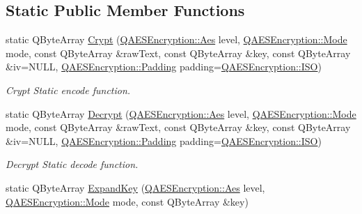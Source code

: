 \subsection*{Static Public Member Functions}
\begin{DoxyCompactItemize}
\item 
static Q\+Byte\+Array \mbox{\hyperlink{class_q_a_e_s_encryption_a43819eeb6a7cb29fbd3cb6ad640dcbdf}{Crypt}} (\mbox{\hyperlink{class_q_a_e_s_encryption_abe48208f4f6c7d68e6a10b49b9d0b7bd}{Q\+A\+E\+S\+Encryption\+::\+Aes}} level, \mbox{\hyperlink{class_q_a_e_s_encryption_ad3e031c49a3d56566379d75b40b7b255}{Q\+A\+E\+S\+Encryption\+::\+Mode}} mode, const Q\+Byte\+Array \&raw\+Text, const Q\+Byte\+Array \&key, const Q\+Byte\+Array \&iv=N\+U\+LL, \mbox{\hyperlink{class_q_a_e_s_encryption_ab0a65cdea4eac21ef32530010d1b0247}{Q\+A\+E\+S\+Encryption\+::\+Padding}} padding=\mbox{\hyperlink{class_q_a_e_s_encryption_ab0a65cdea4eac21ef32530010d1b0247a4fb686e6a16d4242ff35311d2e7c422d}{Q\+A\+E\+S\+Encryption\+::\+I\+SO}})
\begin{DoxyCompactList}\small\item\em Crypt Static encode function. \end{DoxyCompactList}\item 
static Q\+Byte\+Array \mbox{\hyperlink{class_q_a_e_s_encryption_af9baa154a06683049d941bd06ac698fd}{Decrypt}} (\mbox{\hyperlink{class_q_a_e_s_encryption_abe48208f4f6c7d68e6a10b49b9d0b7bd}{Q\+A\+E\+S\+Encryption\+::\+Aes}} level, \mbox{\hyperlink{class_q_a_e_s_encryption_ad3e031c49a3d56566379d75b40b7b255}{Q\+A\+E\+S\+Encryption\+::\+Mode}} mode, const Q\+Byte\+Array \&raw\+Text, const Q\+Byte\+Array \&key, const Q\+Byte\+Array \&iv=N\+U\+LL, \mbox{\hyperlink{class_q_a_e_s_encryption_ab0a65cdea4eac21ef32530010d1b0247}{Q\+A\+E\+S\+Encryption\+::\+Padding}} padding=\mbox{\hyperlink{class_q_a_e_s_encryption_ab0a65cdea4eac21ef32530010d1b0247a4fb686e6a16d4242ff35311d2e7c422d}{Q\+A\+E\+S\+Encryption\+::\+I\+SO}})
\begin{DoxyCompactList}\small\item\em Decrypt Static decode function. \end{DoxyCompactList}\item 
static Q\+Byte\+Array \mbox{\hyperlink{class_q_a_e_s_encryption_a2112456e057e6dd886694348fbf202cd}{Expand\+Key}} (\mbox{\hyperlink{class_q_a_e_s_encryption_abe48208f4f6c7d68e6a10b49b9d0b7bd}{Q\+A\+E\+S\+Encryption\+::\+Aes}} level, \mbox{\hyperlink{class_q_a_e_s_encryption_ad3e031c49a3d56566379d75b40b7b255}{Q\+A\+E\+S\+Encryption\+::\+Mode}} mode, const Q\+Byte\+Array \&key)

\end{DoxyCompactItemize}
